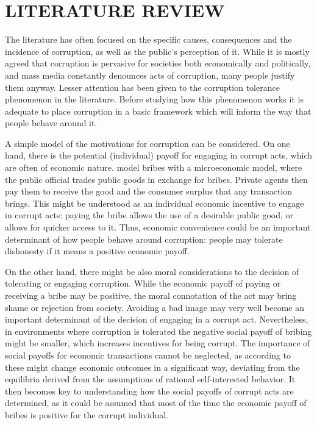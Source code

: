 \documentclass[floatsintext,man]{apa7}\usepackage[]{graphicx}\usepackage[]{color}
\begin{document}


\section{LITERATURE REVIEW}

The literature has often focused on the specific causes, consequences and the incidence of corruption, as well as the public's perception of it. While it is mostly agreed that corruption is pervasive for societies both economically and politically, and mass media constantly denounces acts of corruption, many people justify them anyway. Lesser attention has been given to the corruption tolerance phenomenon in the literature. Before studying how this phenomenon works it is adequate to place corruption in a basic framework which will inform the way that people behave around it. 

A simple model of the motivations for corruption can be considered. On one hand, there is the potential (individual) payoff for engaging in corrupt acts, which are often of economic nature. \textcite{Shleifer.1993} model bribes with a microeconomic model, where the public official trades public goods in exchange for bribes. Private agents then pay them to receive the good and the consumer surplus that any transaction brings. This might be understood as an individual economic incentive to engage in corrupt acts: paying the bribe allows the use of a desirable public good, or allows for quicker access to it. Thus, economic convenience could be an important determinant of how people behave around corruption: people may tolerate dishonesty if it means a positive economic payoff. 

On the other hand, there might be also moral considerations to the decision of tolerating or engaging corruption. While the economic payoff of paying or receiving a bribe may be positive, the moral connotation of the act may bring shame or rejection from society. Avoiding a bad image may very well become an important determinant of the decision of engaging in a corrupt act. Nevertheless, in environments where corruption is tolerated the negative social payoff of bribing might be smaller, which increases incentives for being corrupt. The importance of social payoffs for economic transactions cannot be neglected, as according to \textcite{Akerlof.1980} these might change economic outcomes in a significant way, deviating from the equilibria derived from the assumptions of rational self-interested behavior. It then becomes key to understanding how the social payoffs of corrupt acts are determined, as it could be assumed that most of the time the economic payoff of bribes is positive for the corrupt individual. 
\end{document}
